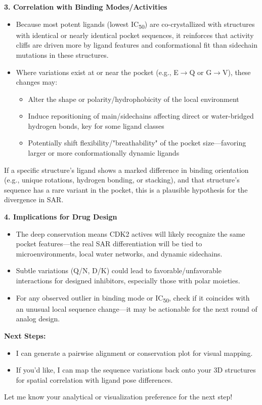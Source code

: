 \documentclass{article}
\begin{document}
\begin{assistantbox}
\textbf{3. Correlation with Binding Modes/Activities}
\begin{itemize}
    \item Because most potent ligands (lowest IC\textsubscript{50}) are co-crystallized with structures with identical or nearly identical pocket sequences, it reinforces that activity cliffs are driven more by ligand features and conformational fit than sidechain mutations in these structures.
    \item Where variations exist at or near the pocket (e.g., E$\rightarrow$Q or G$\rightarrow$V), these changes may:
    \begin{itemize}
        \item Alter the shape or polarity/hydrophobicity of the local environment
        \item Induce repositioning of main/sidechains affecting direct or water-bridged hydrogen bonds, key for some ligand classes
        \item Potentially shift flexibility/"breathability" of the pocket size—favoring larger or more conformationally dynamic ligands
    \end{itemize}
\end{itemize}
If a specific structure’s ligand shows a marked difference in binding orientation (e.g., unique rotations, hydrogen bonding, or stacking), and that structure’s sequence has a rare variant in the pocket, this is a plausible hypothesis for the divergence in SAR.

\textbf{4. Implications for Drug Design}
\begin{itemize}
    \item The deep conservation means CDK2 actives will likely recognize the same pocket features—the real SAR differentiation will be tied to microenvironments, local water networks, and dynamic sidechains.
    \item Subtle variations (Q/N, D/K) could lead to favorable/unfavorable interactions for designed inhibitors, especially those with polar moieties.
    \item For any observed outlier in binding mode or IC\textsubscript{50}, check if it coincides with an unusual local sequence change—it may be actionable for the next round of analog design.
\end{itemize}

\textbf{Next Steps:}
\begin{itemize}
    \item I can generate a pairwise alignment or conservation plot for visual mapping.
    \item If you’d like, I can map the sequence variations back onto your 3D structures for spatial correlation with ligand pose differences.
\end{itemize}

Let me know your analytical or visualization preference for the next step!
\end{assistantbox}
\end{document}
